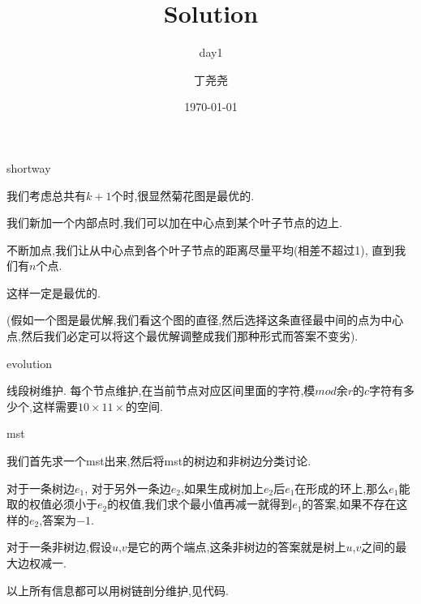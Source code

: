 \documentclass[11pt,serif]{beamer}
\begin{document}
	\author{丁尧尧}
	\title{Solution}
	\subtitle{day1}
	\date{\today}
	
	\begin{frame}[plain]
		\maketitle
	\end{frame}

	\begin{frame}{shortway}
		\begin{solution}
			我们考虑总共有$k+1$个时,很显然菊花图是最优的.
			
			我们新加一个内部点时,我们可以加在中心点到某个叶子节点的边上.
			
			不断加点,我们让从中心点到各个叶子节点的距离尽量平均(相差不超过1), 直到我们有$n$个点.
			
			这样一定是最优的. 
			
			(假如一个图是最优解,我们看这个图的直径,然后选择这条直径最中间的点为中心点,然后我们必定可以将这个最优解调整成我们那种形式而答案不变劣).
		\end{solution}
	\end{frame}

	\begin{frame}{evolution} 
		\begin{solution}
			线段树维护. 每个节点维护,在当前节点对应区间里面的字符,模$mod$余$r$的$c$字符有多少个,这样需要$10 \times 11 \times$的空间.
		\end{solution}	
	\end{frame}

	\begin{frame}{mst}
		\begin{solution}
			我们首先求一个mst出来,然后将mst的树边和非树边分类讨论.
			
			
			对于一条树边$e_1$, 对于另外一条边$e_2$,如果生成树加上$e_2$后$e_1$在形成的环上,那么$e_1$能取的权值必须小于$e_2$的权值,我们求个最小值再减一就得到$e_1$的答案,如果不存在这样的$e_2$,答案为$-1$.
			
			
			对于一条非树边,假设$u$,$v$是它的两个端点,这条非树边的答案就是树上$u$,$v$之间的最大边权减一.
			
			
			以上所有信息都可以用树链剖分维护,见代码.
		\end{solution}
	\end{frame} 
\end{document}
